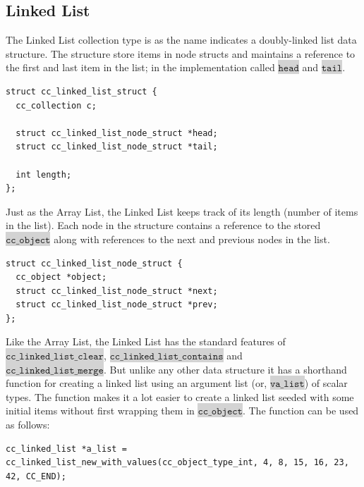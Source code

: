 \documentclass[table]{ituthesis}
\newcommand{\highlight}[1]{\colorbox{lightGray}{$\displaystyle \texttt{#1}$}}
\begin{document}
	\subsection{Linked List}\label{sec:linked_list}
	
	The Linked List collection type is as the name indicates a doubly-linked list data structure. The structure store items in node structs and maintains a reference to the first and last item in the list; in the implementation called \highlight{head} and \highlight{tail}.

\begin{lstlisting}[label=cc_linked_list-struct,caption=Internal representation of Linked List]
struct cc_linked_list_struct {
  cc_collection c;

  struct cc_linked_list_node_struct *head;
  struct cc_linked_list_node_struct *tail;

  int length;
};
\end{lstlisting}

	Just as the Array List, the Linked List keeps track of its length (number of items in the list). Each node in the structure contains a reference to the stored \highlight{cc\_object} along with references to the next and previous nodes in the list.
	
\begin{lstlisting}[label=cc_linked_list-struct,caption=Internal representation of Linked List node]
struct cc_linked_list_node_struct {
  cc_object *object;
  struct cc_linked_list_node_struct *next;
  struct cc_linked_list_node_struct *prev;
};
\end{lstlisting}

	Like the Array List, the Linked List has the standard features of \highlight{cc\_linked\_list\_clear}, \highlight{cc\_linked\_list\_contains} and \\\highlight{cc\_linked\_list\_merge}. But unlike any other data structure it has a shorthand function for creating a linked list using an argument list (or, \highlight{va\_list}) of scalar types. The function makes it a lot easier to create a linked list seeded with some initial items without first wrapping them in \highlight{cc\_object}. The function can be used as follows:
	
\begin{lstlisting}[label=cc_linked_list-struct,caption=Creating a linked list with an argument list]
cc_linked_list *a_list = cc_linked_list_new_with_values(cc_object_type_int, 4, 8, 15, 16, 23, 42, CC_END);
\end{lstlisting}
\end{document}
